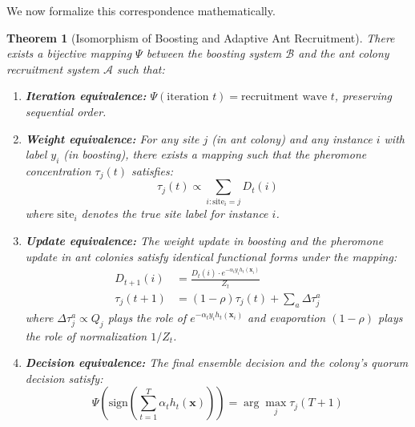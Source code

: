 \documentclass[12pt,letterpaper]{article}
\newtheorem{theorem}{Theorem}[section]
\begin{document}
We now formalize this correspondence mathematically.

\begin{theorem}[Isomorphism of Boosting and Adaptive Ant Recruitment]
There exists a bijective mapping $\Psi$ between the boosting system $\mathcal{B}$ and the ant colony recruitment system $\mathcal{A}$ such that:

\begin{enumerate}
\item \textbf{Iteration equivalence:} $\Psi(\text{iteration } t) = \text{recruitment wave } t$, preserving sequential order.

\item \textbf{Weight equivalence:} For any site $j$ (in ant colony) and any instance $i$ with label $y_i$ (in boosting), there exists a mapping such that the pheromone concentration $\tau_j(t)$ satisfies:
\begin{equation}
\tau_j(t) \propto \sum_{i: \text{site}_i = j} D_t(i)
\end{equation}
where $\text{site}_i$ denotes the true site label for instance $i$.

\item \textbf{Update equivalence:} The weight update in boosting and the pheromone update in ant colonies satisfy identical functional forms under the mapping:
\begin{align}
D_{t+1}(i) &= \frac{D_t(i) \cdot e^{-\alpha_t y_i h_t(\mathbf{x}_i)}}{Z_t} \\
\tau_j(t+1) &= (1-\rho)\tau_j(t) + \sum_a \Delta \tau_j^a
\end{align}
where $\Delta \tau_j^a \propto Q_j$ plays the role of $e^{-\alpha_t y_i h_t(\mathbf{x}_i)}$ and evaporation $(1-\rho)$ plays the role of normalization $1/Z_t$.

\item \textbf{Decision equivalence:} The final ensemble decision and the colony's quorum decision satisfy:
\begin{equation}
\Psi\left(\text{sign}\left(\sum_{t=1}^T \alpha_t h_t(\mathbf{x})\right)\right) = \arg\max_j \tau_j(T+1)
\end{equation}
\end{enumerate}
\end{theorem}
\end{document}
